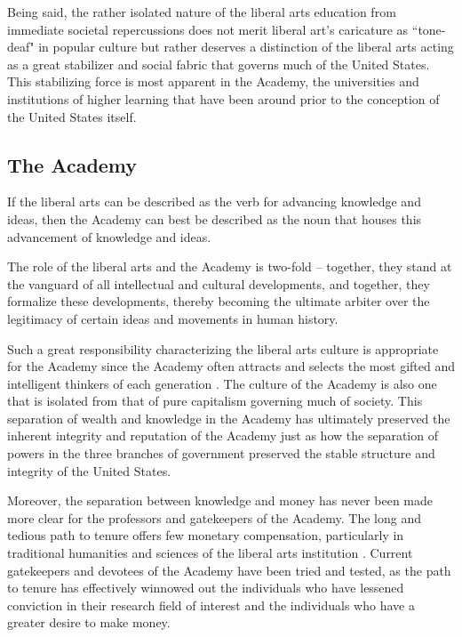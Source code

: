 \documentclass[12pt,letterpaper]{article}
\begin{document}
Being said, the rather isolated nature of the liberal arts education from immediate societal repercussions does not merit liberal art's caricature as ``tone-deaf" in popular culture but rather deserves a distinction of the liberal arts acting as a great stabilizer and social fabric that governs much of the United States.  This stabilizing force is most apparent in the Academy,  the universities and institutions of higher learning that have been around prior to the conception of the United States itself.

\subsection{The Academy}
If the liberal arts can be described as the verb for advancing knowledge and ideas, then the Academy can best be described as the noun that houses this advancement of knowledge and ideas.

The role of the liberal arts and the Academy is two-fold -- together, they stand at the vanguard of all intellectual and cultural developments, and together, they formalize these developments, thereby becoming the ultimate arbiter over the legitimacy of certain ideas and movements in human history.

Such a great responsibility characterizing the liberal arts culture is appropriate for the Academy since the Academy often attracts and selects the most gifted and intelligent thinkers of each generation \cite{marketer_top_nodate}.  The culture of the Academy is also one that is isolated from that of pure capitalism governing much of society.  This separation of wealth and knowledge in the Academy has ultimately preserved the inherent integrity and reputation of the Academy just as how the separation of powers in the three branches of government preserved the stable structure and integrity of the United States.  


Moreover, the separation between knowledge and money has never been made more clear for the professors and gatekeepers of the Academy.  The long and tedious path to tenure offers few monetary compensation, particularly in traditional humanities and sciences of the liberal arts institution \cite{noauthor_liberal_nodate}.  Current gatekeepers and devotees of the Academy have been tried and tested, as the path to tenure has effectively winnowed out the individuals who have lessened conviction in their research field of interest and the individuals who have a greater desire to make money.
\end{document}
